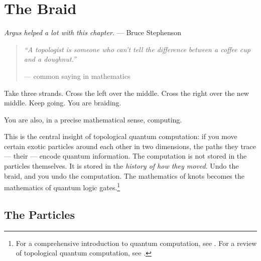 
\chapter{The Braid}
\label{spine:the-braid}

\textit{Argus helped a lot with this chapter.} --- Bruce Stephenson

\begin{quote}\small\textit{%
``A topologist is someone who can't tell the difference between a coffee cup and a doughnut.''%
}\par\raggedleft --- common saying in mathematics\end{quote}

\vspace{0.5cm}


Take three strands. Cross the left over the middle. Cross the right over the new middle. Keep going. You are braiding.

You are also, in a precise mathematical sense, computing.

This is the central insight of topological quantum computation: if you move certain exotic particles around each other in two dimensions, the paths they trace --- their  --- encode quantum information. The computation is not stored in the particles themselves. It is stored in the \textit{history of how they moved}. Undo the braid, and you undo the computation. The mathematics of knots becomes the mathematics of quantum logic gates.\footnote{For a comprehensive introduction to quantum computation, see \cite{nielsen2000}. For a review of topological quantum computation, see \cite{nayak2008}.}

\section*{The Particles}
\label{spine:braid-the-particles}


